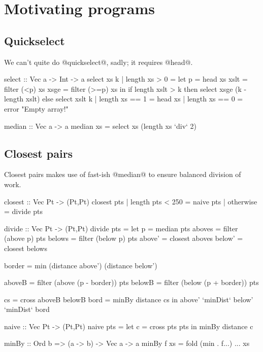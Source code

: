 \section{Motivating programs}


\subsection{Quickselect}
We can't quite do @quickselect@, sadly; it requires @head@.
\begin{code}
select :: Vec a -> Int -> a
select xs k
 | length xs > 0
 = let p    = head xs 
       xslt = filter  (<p) xs
       xsge = filter (>=p) xs
   in  if     length xslt > k
       then   select xsge (k - length xslt)
       else   select xslt  k
 | length xs == 1
 = head xs
 | length xs == 0
 = error "Empty array!"

median :: Vec a -> a
median xs
 = select xs (length xs `div` 2)
\end{code}

\subsection{Closest pairs}
Closest pairs makes use of fast-ish @median@ to ensure balanced division of work.
\begin{code}
closest :: Vec Pt -> (Pt,Pt)
closest pts
 | length pts < 250
 = naive pts
 | otherwise
 = divide pts

divide :: Vec Pt -> (Pt,Pt)
divide pts
 = let p      = median pts
       aboves = filter (above p) pts
       belows = filter (below p) pts
       above' = closest aboves
       below' = closest belows

       border = min (distance above') (distance below')

       aboveB = filter (above (p - border)) pts
       belowB = filter (below (p + border)) pts

       cs     = cross aboveB belowB
       bord   = minBy distance cs
   in  above' `minDist` below' `minDist` bord


naive :: Vec Pt -> (Pt,Pt)
naive pts
 = let c = cross pts pts
   in  minBy distance c

minBy :: Ord b => (a -> b) -> Vec a -> a
minBy f xs
 = fold (min . f...) ... xs
\end{code}

